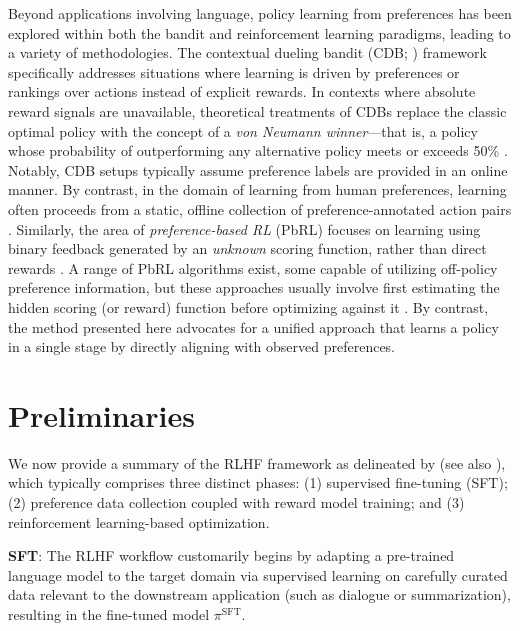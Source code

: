 Beyond applications involving language, policy learning from preferences has been explored within both the bandit and reinforcement learning paradigms, leading to a variety of methodologies. The contextual dueling bandit (CDB; \cite{yue2012karmed, dudik2015contextual}) framework specifically addresses situations where learning is driven by preferences or rankings over actions instead of explicit rewards. In contexts where absolute reward signals are unavailable, theoretical treatments of CDBs replace the classic optimal policy with the concept of a \textit{von Neumann winner}—that is, a policy whose probability of outperforming any alternative policy meets or exceeds 50\% \citep{dudik2015contextual}. Notably, CDB setups typically assume preference labels are provided in an online manner. By contrast, in the domain of learning from human preferences, learning often proceeds from a static, offline collection of preference-annotated action pairs \citep{yan2022human}. Similarly, the area of \textit{preference-based RL} (PbRL) focuses on learning using binary feedback generated by an \textit{unknown} scoring function, rather than direct rewards \citep{BusaFekete2014, ruiz2023dueling}. A range of PbRL algorithms exist, some capable of utilizing off-policy preference information, but these approaches usually involve first estimating the hidden scoring (or reward) function before optimizing against it \citep{jain2013learning, BusaFekete2014, christiano2017deep, sadigh2017active, kupcsik2018learning}. By contrast, the method presented here advocates for a unified approach that learns a policy in a single stage by directly aligning with observed preferences.

\section{Preliminaries}\label{section:prelims}

We now provide a summary of the RLHF framework as delineated by \citeauthor{ziegler2020finetuning} (see also \citep{stiennon2022learning, bai2022training, ouyang2022training}), which typically comprises three distinct phases: (1) supervised fine-tuning (SFT); (2) preference data collection coupled with reward model training; and (3) reinforcement learning-based optimization.

\textbf{SFT}: The RLHF workflow customarily begins by adapting a pre-trained language model to the target domain via supervised learning on carefully curated data relevant to the downstream application (such as dialogue or summarization), resulting in the fine-tuned model $\pi^\text{SFT}$.

